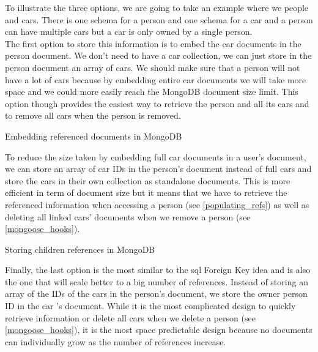 \documentclass[twoside, openright,11pt,a4paper]{book}
\newenvironment{code}{\captionsetup{type=listing}}{}
\begin{document}
To illustrate the three options, we are going to take an example where we people and cars. There is one schema for a person and one schema for a car and a person can have multiple cars but a car is only owned by a single person. \\

The first option to store this information is to embed the car documents in the person document\cite{mongo:doc:refs:embeddingRefs}. We don't need to have a car collection, we can just store in the person document an array of cars. We should make sure that a person will not have a lot of cars because by embedding entire car documents we will take more space and we could more easily reach the MongoDB document size limit. This option though provides the easiest way to retrieve the person and all its cars and to remove all cars when the person is removed. \\
\begin{code}
	\caption{Embedding referenced documents in MongoDB}
\end{code}

To reduce the size taken by embedding full car documents in a user's document, we can store an array of car IDs in the person's document\cite{mongo:doc:refs:linkingRefs} instead of full cars and store the cars in their own collection as standalone documents. This is more efficient in term of document size but it means that we have to retrieve the referenced information when accessing a person (see \ref{populating_refs}) as well as deleting all linked cars' documents when we remove a person (see \ref{mongoose_hooks}). \\

\begin{code}
	\caption{Storing children references in MongoDB}
\end{code}

Finally, the last option\cite{mongo:doc:refs:linkingRefs} is the most similar to the \gls{sql} Foreign Key idea and is also the one that will scale better to a big number of references. Instead of storing an array of the IDs of the cars in the person's document, we store the owner person ID in the car 's document. While it is the most complicated design to quickly retrieve information or delete all cars when we delete a person (see \ref{mongoose_hooks}), it is the most space predictable design because no documents can individually grow as the number of references increase.\\
\end{document}
